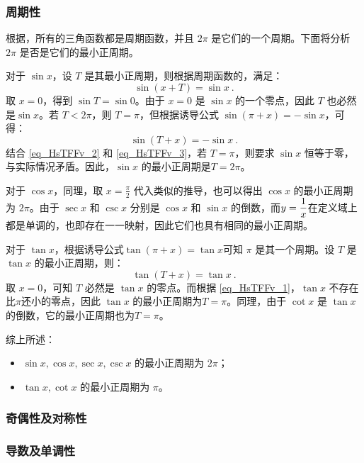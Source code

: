 \subsubsection{周期性}

根据，所有的三角函数都是周期函数，并且 $2\pi$ 是它们的一个周期。下面将分析 $2\pi$ 是否是它们的最小正周期。

对于 $\sin x$，设 $T$ 是其最小正周期，则根据周期函数的，满足：
\begin{equation}\label{eq_HsTFFv_2}
\sin (x+T) = \sin x~.
\end{equation}
取 $x=0$，得到 $\sin T = \sin 0$。由于 $x=0$ 是 $\sin x$ 的一个零点，因此 $T$ 也必然是$\sin x$。若 $T<2\pi$，则 $T=\pi$，但根据诱导公式 $\sin(\pi + x) = -\sin x$，可得：
\begin{equation}\label{eq_HsTFFv_3}
\sin (T + x) = -\sin x~.
\end{equation}
结合 \autoref{eq_HsTFFv_2} 和 \autoref{eq_HsTFFv_3}，若 $T=\pi$，则要求 $\sin x$ 恒等于零，与实际情况矛盾。因此，$\sin x$ 的最小正周期是$T = 2\pi$。

对于 $\cos x$，同理，取 $x=\frac{\pi}{2}$ 代入类似的推导，也可以得出 $\cos x$ 的最小正周期为 $2\pi$。由于 $\sec x$ 和 $\csc x$ 分别是 $\cos x$ 和 $\sin x$ 的倒数，而$\displaystyle y={1\over x}$在定义域上都是单调的，也即存在一一映射，因此它们也具有相同的最小正周期。

对于 $\tan x$，根据诱导公式$\tan (\pi + x) = \tan x$可知 $\pi$ 是其一个周期。设 $T$ 是 $\tan x$ 的最小正周期，则：
\begin{equation}
\tan (T + x) = \tan x~.
\end{equation}
取 $x=0$，可知 $T$ 必然是 $\tan x$ 的零点。而根据 \autoref{eq_HsTFFv_1}，$\tan x$ 不存在比$\pi$还小的零点，因此 $\tan x$ 的最小正周期为$T = \pi$。同理，由于 $\cot x$ 是 $\tan x$ 的倒数，它的最小正周期也为$T = \pi$。

综上所述：
\begin{itemize}
\item $\sin x, \cos x, \sec x, \csc x$ 的最小正周期为 $2\pi$；
\item $\tan x, \cot x$ 的最小正周期为 $\pi$。
\end{itemize}

\subsubsection{奇偶性及对称性}

\subsubsection{导数及单调性}

